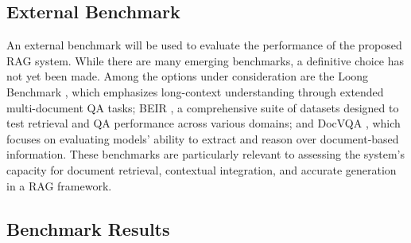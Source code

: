 \subsection{External Benchmark}
\label{subsec:externalbenchmark}
An external benchmark will be used to evaluate the performance of the proposed RAG system. While there are many emerging benchmarks, a definitive choice has not yet been made. Among the options under consideration are the Loong Benchmark \cite{wang2024leavedocumentbehindbenchmarking}, which emphasizes long-context understanding through extended multi-document QA tasks; BEIR \cite{thakur2021beir}, a comprehensive suite of datasets designed to test retrieval and QA performance across various domains; and DocVQA \cite{mathew2021documentvisualquestionanswering}, which focuses on evaluating models' ability to extract and reason over document-based information. These benchmarks are particularly relevant to assessing the system's capacity for document retrieval, contextual integration, and accurate generation in a RAG framework.

\subsection{Benchmark Results}